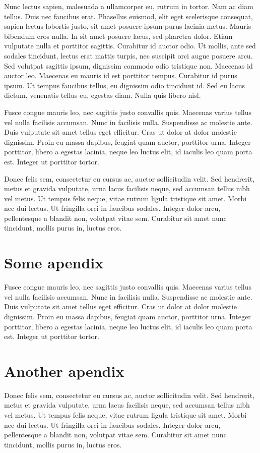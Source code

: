 \documentclass{UoYCSproject}
\begin{document}
Nunc lectus sapien, malesuada a ullamcorper eu, rutrum in tortor. Nam ac diam tellus. Duis nec faucibus erat. Phasellus euismod, elit eget scelerisque consequat, sapien lectus lobortis justo, sit amet posuere ipsum purus lacinia metus. Mauris bibendum eros nulla. In sit amet posuere lacus, sed pharetra dolor. Etiam vulputate nulla et porttitor sagittis. Curabitur id auctor odio. Ut mollis, ante sed sodales tincidunt, lectus erat mattis turpis, nec suscipit orci augue posuere arcu. Sed volutpat sagittis ipsum, dignissim commodo odio tristique non. Maecenas id auctor leo. Maecenas eu mauris id est porttitor tempus. Curabitur id purus ipsum. Ut tempus faucibus tellus, eu dignissim odio tincidunt id. Sed eu lacus dictum, venenatis tellus eu, egestas diam. Nulla quis libero nisl.

Fusce congue mauris leo, nec sagittis justo convallis quis. Maecenas varius tellus vel nulla facilisis accumsan. Nunc in facilisis nulla. Suspendisse ac molestie ante. Duis vulputate sit amet tellus eget efficitur. Cras ut dolor at dolor molestie dignissim. Proin eu massa dapibus, feugiat quam auctor, porttitor urna. Integer porttitor, libero a egestas lacinia, neque leo luctus elit, id iaculis leo quam porta est. Integer ut porttitor tortor.

Donec felis sem, consectetur eu cursus ac, auctor sollicitudin velit. Sed hendrerit, metus et gravida vulputate, urna lacus facilisis neque, sed accumsan tellus nibh vel metus. Ut tempus felis neque, vitae rutrum ligula tristique sit amet. Morbi nec dui lectus. Ut fringilla orci in faucibus sodales. Integer dolor arcu, pellentesque a blandit non, volutpat vitae sem. Curabitur sit amet nunc tincidunt, mollis purus in, luctus eros.

\appendix
\chapter{Some apendix}
Fusce congue mauris leo, nec sagittis justo convallis quis. Maecenas varius tellus vel nulla facilisis accumsan. Nunc in facilisis nulla. Suspendisse ac molestie ante. Duis vulputate sit amet tellus eget efficitur. Cras ut dolor at dolor molestie dignissim. Proin eu massa dapibus, feugiat quam auctor, porttitor urna. Integer porttitor, libero a egestas lacinia, neque leo luctus elit, id iaculis leo quam porta est. Integer ut porttitor tortor.

\chapter{Another apendix}
Donec felis sem, consectetur eu cursus ac, auctor sollicitudin velit. Sed hendrerit, metus et gravida vulputate, urna lacus facilisis neque, sed accumsan tellus nibh vel metus. Ut tempus felis neque, vitae rutrum ligula tristique sit amet. Morbi nec dui lectus. Ut fringilla orci in faucibus sodales. Integer dolor arcu, pellentesque a blandit non, volutpat vitae sem. Curabitur sit amet nunc tincidunt, mollis purus in, luctus eros.


\printbibliography
\end{document}
